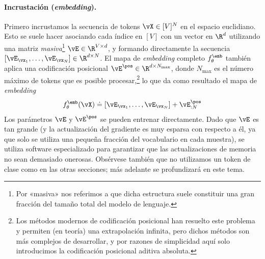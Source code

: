\documentclass[../../book-main_es.tex]{subfiles}
\begin{document}
\paragraph{Incrustación (\textit{embedding}).} Primero incrustamos la secuencia de tokens \(\vX \in
[V]^{N}\) en el espacio euclidiano. Esto se suele hacer asociando cada
índice en \([V]\) con un vector en \(\R^{d}\) utilizando una matriz
\textit{masiva}\footnote{Por «masiva» nos referimos a que dicha
estructura suele constituir una gran fracción del tamaño total del modelo de lenguaje.} 
\(\vE \in \R^{V \times d}\), y formando directamente la
secuencia \([\vE_{\vx_{1}}, \dots, \vE_{\vx_{N}}] \in \R^{d \times
N}\). El mapa de \textit{embedding} completo \(f_{\theta}^{\emb}\) también aplica una
codificación posicional \(\vE^{\pos} \in \R^{d  \times N_{\max}}\), donde
\(N_{\max}\) es el número máximo de tokens que es posible
procesar,\footnote{Los métodos modernos de codificación posicional han resuelto
este problema y permiten (en teoría) una extrapolación infinita,
pero dichos métodos son más complejos de desarrollar, y por
razones de simplicidad aquí solo introducimos la codificación posicional
aditiva absoluta.} lo que da como resultado el mapa de \textit{embedding}
\begin{equation}
f_{\theta}^{\emb}(\vX) \doteq [\vE_{\vx_{1}}, \dots, \vE_{\vx_{N}}] +
\vE_{:N}^{\pos}
\end{equation}
Los parámetros \(\vE\) y \(\vE^{\pos}\) se pueden entrenar directamente.
Dado que \(\vE\) es tan grande (y la actualización del gradiente es muy esparsa
con respecto a él, ya que solo se utiliza una pequeña fracción del vocabulario en
cada muestra), se utiliza software especializado para garantizar que las actualizaciones de memoria
no sean demasiado onerosas. Obsérvese también que no utilizamos un token de clase
como en las otras secciones; más adelante se profundizará en este tema.
\end{document}
